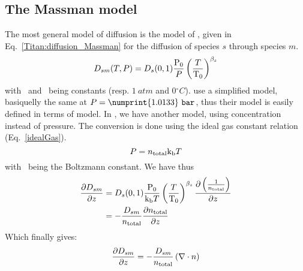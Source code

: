 \subsection{The Massman model}

The most general model of diffusion is the model of \citet{Massman1998}, given
in Eq.~\ref{Titan:diffusion_Massman} for the diffusion of species $s$ through
species $m$.
\begin{equation}
D_{sm}(T,P) = D_s(0,1) \frac{\mathrm{P_0}}{P}\left(\frac{T}{\mathrm{T_0}}\right)^{\beta_s}
\label{Titan:diffusion_Massman}
\end{equation}
with \Pz\ and \Tz\ being constants (resp. $1~\unit{atm}$ and $0\unit{^\circ C}$).
\citet{Wakeham1973} use a simplified model, basiquelly the same at $P=\numprint{1.0133}~\unit{bar}$, thus
their model is easily defined in terms of \citet{Massman1998} model. In \citet{WilsonPhD,Haye2005},
we have another model, using concentration instead of pressure. The conversion is done
using the ideal gas constant relation (Eq.~\ref{idealGas}).
\begin{equation}
P = n_\text{total}\text{k}_\text{b} T
\label{idealGas}
\end{equation}
with \kb\ being the Boltzmann constant.
We have thus
\begin{equation}
\begin{split}
\frac{\partial D_{sm}}{\partial z} & = D_s(0,1) \frac{\mathrm{P_0}}{\text{k}_\text{b} T}\left(\frac{T}{\mathrm{T_0}}\right)^{\beta_s} \frac{\partial\left(\frac{1}{n_\text{total}}\right)}{\partial z}\\
                     & = -\frac{D_{sm}}{n_\text{total}}\frac{\partial n_\text{total}}{\partial z}
\end{split}
\end{equation}
Which finally gives:
\begin{equation}
\frac{\partial D_{sm}}{\partial z}  = -\frac{D_{sm}}{n_\text{total}}\left(\nabla\cdot{\ensuremath{n}}\right)
\label{Titan:Massman_derive}
\end{equation}

